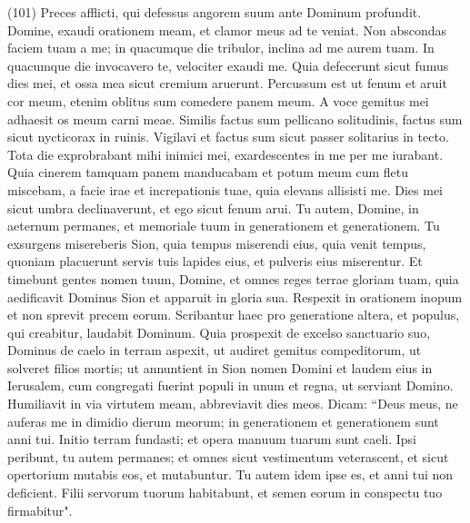 \begin{biblechapter}  (101) 
\verse Preces afflicti, qui defessus angorem suum ante Dominum profundit. 
\verse Domine, exaudi orationem meam, et clamor meus ad te veniat. 
\verse Non abscondas faciem tuam a me; in quacumque die tribulor, inclina ad me aurem tuam. In quacumque die invocavero te, velociter exaudi me. 
\verse Quia defecerunt sicut fumus dies mei, et ossa mea sicut cremium aruerunt. 
\verse Percussum est ut fenum et aruit cor meum, etenim oblitus sum comedere panem meum. 
\verse A voce gemitus mei adhaesit os meum carni meae. 
\verse Similis factus sum pellicano solitudinis, factus sum sicut nycticorax in ruinis. 
\verse Vigilavi et factus sum sicut passer solitarius in tecto. 
\verse Tota die exprobrabant mihi inimici mei, exardescentes in me per me iurabant. 
\verse Quia cinerem tamquam panem manducabam et potum meum cum fletu miscebam, 
\verse a facie irae et increpationis tuae, quia elevans allisisti me. 
\verse Dies mei sicut umbra declinaverunt, et ego sicut fenum arui. 
\verse Tu autem, Domine, in aeternum permanes, et memoriale tuum in generationem et generationem. 
\verse Tu exsurgens misereberis Sion, quia tempus miserendi eius, quia venit tempus, 
\verse quoniam placuerunt servis tuis lapides eius, et pulveris eius miserentur. 
\verse Et timebunt gentes nomen tuum, Domine, et omnes reges terrae gloriam tuam, 
\verse quia aedificavit Dominus Sion et apparuit in gloria sua. 
\verse Respexit in orationem inopum et non sprevit precem eorum. 
\verse Scribantur haec pro generatione altera, et populus, qui creabitur, laudabit Dominum. 
\verse Quia prospexit de excelso sanctuario suo, Dominus de caelo in terram aspexit, 
\verse ut audiret gemitus compeditorum, ut solveret filios mortis; 
\verse ut annuntient in Sion nomen Domini et laudem eius in Ierusalem, 
\verse cum congregati fuerint populi in unum et regna, ut serviant Domino. 
\verse Humiliavit in via virtutem meam, abbreviavit dies meos. Dicam: “Deus meus, 
\verse ne auferas me in dimidio dierum meorum; in generationem et generationem sunt anni tui. 
\verse Initio terram fundasti; et opera manuum tuarum sunt caeli. 
\verse Ipsi peribunt, tu autem permanes; et omnes sicut vestimentum veterascent, et sicut opertorium mutabis eos, et mutabuntur. 
\verse Tu autem idem ipse es, et anni tui non deficient. 
\verse Filii servorum tuorum habitabunt, et semen eorum in conspectu tuo firmabitur". 
\end{biblechapter}

